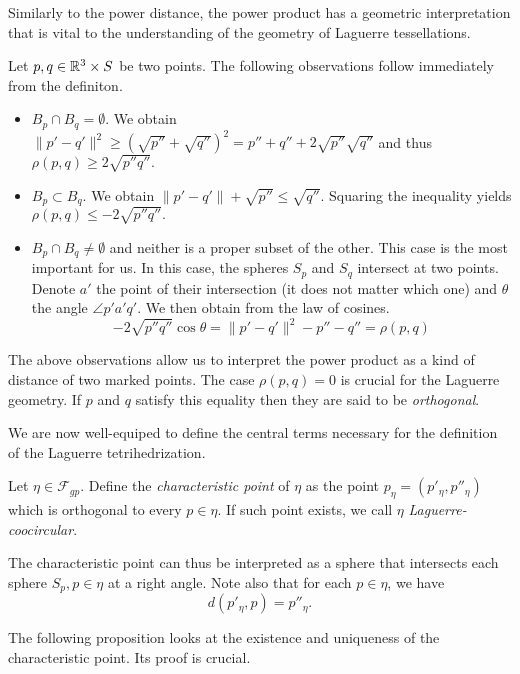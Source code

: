Similarly to the power distance, the power product has a geometric interpretation that is vital to the understanding of the geometry of Laguerre tessellations.

Let $p,q \in {\mathbb R^3}\times S$ be two points. The following observations follow immediately from the definiton. 
\begin{itemize}
	\item $B_p\cap B_q = \emptyset$. We obtain $\|p'-q'\|^2 \geq (\sqrt{p''} + \sqrt{q''})^2 = p'' + q'' + 2\sqrt{p''}\sqrt{q''}$ and thus $\rho(p,q) \geq 2\sqrt{p'' q''}.$ 
	\item $B_p \subset B_q$. We obtain $\|p'-q'\| + \sqrt{p''} \leq \sqrt{q''} $. Squaring the inequality yields $\rho(p,q) \leq -2\sqrt{p'' q''}.$ 
	\item $B_p \cap B_q \neq \emptyset$ and neither is a proper subset of the other. This case is the most important for us. In this case, the spheres $S_p$ and $S_q$ intersect at two points. Denote $a'$ the point of their intersection (it does not matter which one) and $\theta$ the angle $\angle p'a'q'$. We then obtain from the law of cosines. 
	$$- 2\sqrt{p'' q''}\cos \theta = \|p'-q'\|^2 - p'' - q'' = \rho(p,q)$$
\end{itemize}

The above observations allow us to interpret the power product as a kind of distance of two marked points. The case $\rho(p,q)=0$ is crucial for the Laguerre geometry. If $p$ and $q$ satisfy this equality then they are said to be \textit{orthogonal}. 

We are now well-equiped to define the central terms necessary for the definition of the Laguerre tetrihedrization.

\begin{definition}
	Let $\eta\in\mathcal F_{gp}$. Define the \textit{characteristic point} of $\eta$ as the point $p_{\eta} = (p'_\eta, p''_\eta)$ which is orthogonal to every $p\in \eta$. If such point exists, we call $\eta$ \textit{Laguerre-coocircular}. 
\end{definition}
The characteristic point can thus be interpreted as a sphere that intersects each sphere $S_p, p\in\eta$ at a right angle. Note also that for each $p\in\eta$, we have
$$d(p'_\eta,p)=p''_\eta.$$

The following proposition looks at the existence and uniqueness of the characteristic point. Its proof is crucial.

